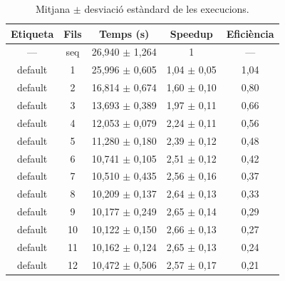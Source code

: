 \begin{table}[H]
\centering
\begin{tabular}{|c|c|c|c|c|}
\hline
\textbf{Etiqueta} & \textbf{Fils} & \textbf{Temps (s)} & \textbf{Speedup} & \textbf{Eficiència} \\ \hline
--- & seq & 26,940 $\pm$ 1,264 & 1 & --- \\ \hline
default & 1 & 25,996 $\pm$ 0,605 & 1,04 $\pm$ 0,05 & 1,04 \\ \hline
default & 2 & 16,814 $\pm$ 0,674 & 1,60 $\pm$ 0,10 & 0,80 \\ \hline
default & 3 & 13,693 $\pm$ 0,389 & 1,97 $\pm$ 0,11 & 0,66 \\ \hline
default & 4 & 12,053 $\pm$ 0,079 & 2,24 $\pm$ 0,11 & 0,56 \\ \hline
default & 5 & 11,280 $\pm$ 0,180 & 2,39 $\pm$ 0,12 & 0,48 \\ \hline
default & 6 & 10,741 $\pm$ 0,105 & 2,51 $\pm$ 0,12 & 0,42 \\ \hline
default & 7 & 10,510 $\pm$ 0,435 & 2,56 $\pm$ 0,16 & 0,37 \\ \hline
default & 8 & 10,209 $\pm$ 0,137 & 2,64 $\pm$ 0,13 & 0,33 \\ \hline
default & 9 & 10,177 $\pm$ 0,249 & 2,65 $\pm$ 0,14 & 0,29 \\ \hline
default & 10 & 10,122 $\pm$ 0,150 & 2,66 $\pm$ 0,13 & 0,27 \\ \hline
default & 11 & 10,162 $\pm$ 0,124 & 2,65 $\pm$ 0,13 & 0,24 \\ \hline
default & 12 & 10,472 $\pm$ 0,506 & 2,57 $\pm$ 0,17 & 0,21 \\ \hline
\end{tabular}
\caption{Mitjana $\pm$ desviació estàndard de les execucions.}
\label{tab:resultats}
\end{table}

